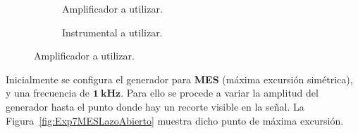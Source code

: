       \begin{figure}[H]
        \centering
        \begin{subfigure}[H]{0.48\textwidth}
          \caption{Amplificador a utilizar.}
          \label{fig:Exp7Amplificador}
        \end{subfigure}
        \hfill 
        \begin{subfigure}[H]{0.48\textwidth}
          \caption{Instrumental a utilizar.}
          \label{fig:Exp7Instrumental}
        \end{subfigure} 

          \caption{Amplificador a utilizar.}
          \label{fig:Exp7Circuito}
      \end{figure} 

    Inicialmente se configura el generador para \textbf{MES} (máxima excursión simétrica), y 
    una frecuencia de $\mathbf{1~kHz}$. Para ello se procede a variar la amplitud del generador hasta 
    el punto donde hay un recorte visible en la señal. La Figura~\ref{fig:Exp7MESLazoAbierto} 
    muestra dicho punto de máxima excursión.

